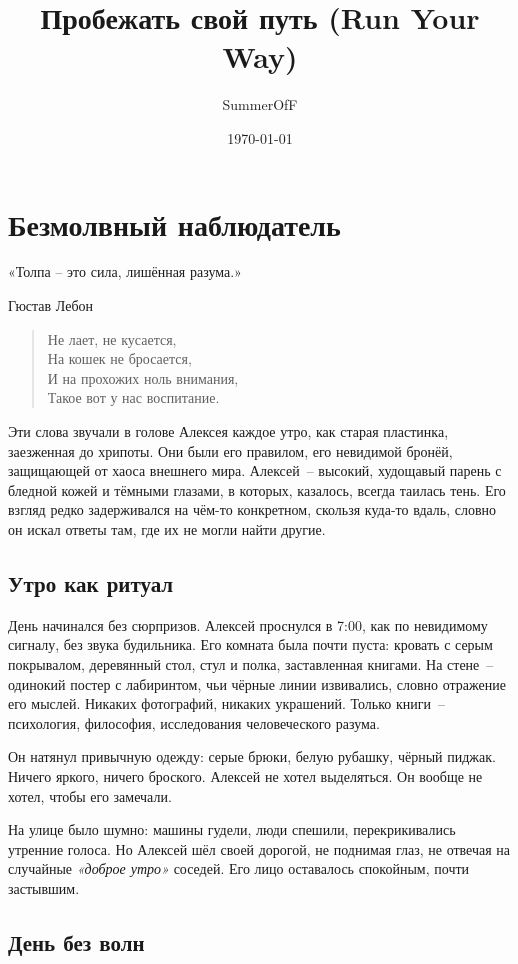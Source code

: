 \documentclass[12pt,a4paper]{book}
\title{Пробежать свой путь (Run Your Way)}
\author{SummerOfF}
\date{\today}
\begin{document}
\maketitle
\tableofcontents

\chapter{Безмолвный наблюдатель}
\epigraph{«Толпа -- это сила, лишённая разума.»}{Гюстав Лебон}
\begin{verse}
Не лает, не кусается,\\
На кошек не бросается,\\
И на прохожих ноль внимания,\\
Такое вот у нас воспитание.
\end{verse}

Эти слова звучали в голове Алексея каждое утро, как старая пластинка, заезженная до хрипоты. Они были его правилом, его невидимой бронёй, защищающей от хаоса внешнего мира. Алексей~-- высокий, худощавый парень с бледной кожей и тёмными глазами, в которых, казалось, всегда таилась тень. Его взгляд редко задерживался на чём-то конкретном, скользя куда-то вдаль, словно он искал ответы там, где их не могли найти другие.

\section{Утро как ритуал}

День начинался без сюрпризов. Алексей проснулся в 7:00, как по невидимому сигналу, без звука будильника. Его комната была почти пуста: кровать с серым покрывалом, деревянный стол, стул и полка, заставленная книгами. На стене~-- одинокий постер с лабиринтом, чьи чёрные линии извивались, словно отражение его мыслей. Никаких фотографий, никаких украшений. Только книги~-- психология, философия, исследования человеческого разума.

Он натянул привычную одежду: серые брюки, белую рубашку, чёрный пиджак. Ничего яркого, ничего броского. Алексей не хотел выделяться. Он вообще не хотел, чтобы его замечали.

На улице было шумно: машины гудели, люди спешили, перекрикивались утренние голоса. Но Алексей шёл своей дорогой, не поднимая глаз, не отвечая на случайные \textit{«доброе утро»} соседей. Его лицо оставалось спокойным, почти застывшим.

\section{День без волн}
\end{document}
